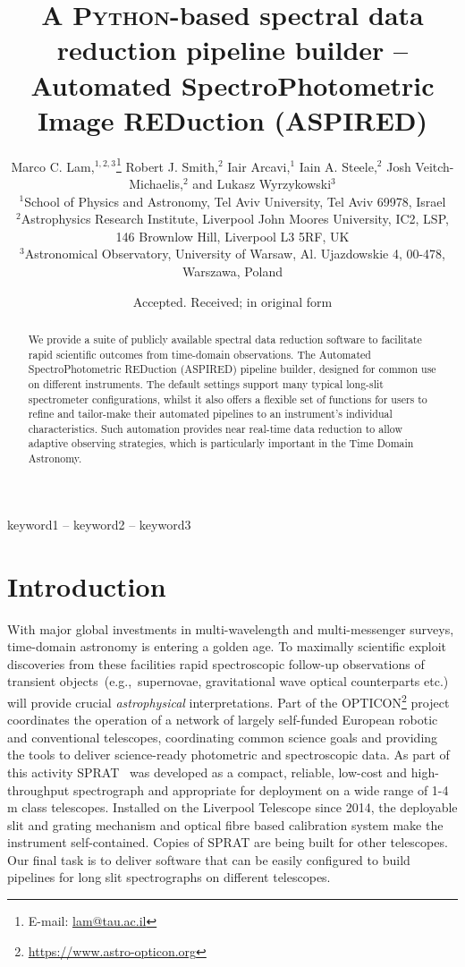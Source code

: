 \documentclass[fleqn,usenatbib]{mnras}
\title[ASPIRED]{A \textsc{Python}-based spectral data reduction pipeline builder --\\
Automated SpectroPhotometric Image REDuction (ASPIRED)}
\author[M. C. Lam et al.]
{Marco C. Lam,$^{1, 2, 3}$\thanks{E-mail: \href{mailto:lam@tau.ac.il}{lam@tau.ac.il}}
Robert J. Smith,$^{2}$
Iair Arcavi,$^{1}$
Iain A. Steele,$^{2}$
Josh Veitch-Michaelis,$^{2}$ and
\newauthor Lukasz Wyrzykowski$^{3}$
\\
$^{1}$School of Physics and Astronomy, Tel Aviv University, Tel Aviv 69978, Israel\\
$^{2}$Astrophysics Research Institute, Liverpool John Moores University, IC2, LSP, 146 Brownlow Hill, Liverpool L3 5RF, UK\\
$^{3}$Astronomical Observatory, University of Warsaw, Al. Ujazdowskie 4, 00-478, Warszawa, Poland
}
\date{Accepted. Received; in original form}
\begin{document}
\label{firstpage}
\pagerange{\pageref{firstpage}--\pageref{lastpage}}
\maketitle

\begin{abstract}
We provide a suite of publicly available spectral data reduction software
to facilitate rapid scientific outcomes from time-domain observations. The Automated
SpectroPhotometric REDuction (\textsc{ASPIRED}) pipeline builder, designed for common
use on different instruments. The default settings support many typical long-slit
spectrometer configurations, whilst it also offers a flexible set of functions for
users to refine and tailor-make their automated pipelines to an instrument's
individual characteristics. Such automation provides near real-time data reduction
to allow adaptive observing strategies, which is particularly important in the Time
Domain Astronomy.
\end{abstract}

\begin{keywords}
keyword1 -- keyword2 -- keyword3
\end{keywords}



\section{Introduction}
With major global investments in multi-wavelength and multi-messenger surveys, time-domain
astronomy is entering a golden age. To maximally scientific exploit discoveries from these
facilities rapid spectroscopic follow-up observations of transient objects~(e.g.,\ supernovae,
gravitational wave optical counterparts etc.) will provide crucial {\em astrophysical} 
interpretations. Part of the OPTICON\footnote{\url{https://www.astro-opticon.org}} project
coordinates the operation of a network of largely self-funded European robotic and conventional
telescopes, coordinating common science goals and providing the tools to deliver science-ready
photometric and spectroscopic data. As part of this activity SPRAT~\citep{2014SPIE.9147E..8HP}
was developed as a compact, reliable, low-cost and high-throughput spectrograph and appropriate
for deployment on a wide range of 1-4\,m class telescopes. Installed on the Liverpool Telescope
since 2014, the deployable slit and grating mechanism and optical fibre based calibration
system make the instrument self-contained. Copies of SPRAT are being built for other 
telescopes. Our final task is to deliver software that can be easily configured to build
pipelines for long slit spectrographs on different telescopes.
\end{document}
